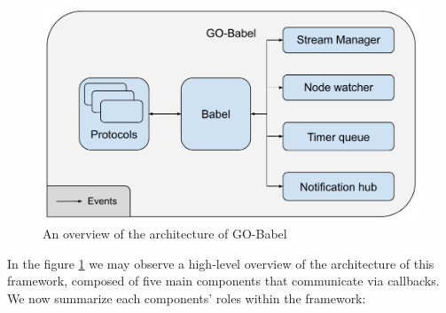 \begin{figure}[htbp]
    \centering
    \includegraphics[width=\textwidth]{Chapters/Figures/Go-Babel-Overview.pdf}
    \caption{An overview of the architecture of GO-Babel}
    \label{fig:go-babel-overview}
\end{figure}

In the figure \ref{fig:go-babel-overview} we may observe a high-level overview of the architecture of this framework, composed of five main components that communicate via callbacks. We now summarize each components' roles within the framework:

